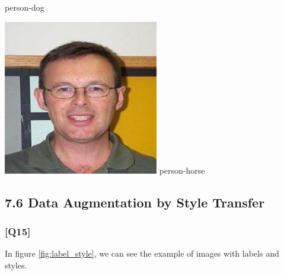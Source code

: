 \documentclass{article}
\begin{document}
\begin{center}
\begin{minipage}{0.142\textwidth}
        person-dog
    \end{minipage}%
    \begin{minipage}{0.142\textwidth}
        \includegraphics[width=\linewidth]{./pic/misclassified_r6_p4_2723.jpg}
        person-horse
    \end{minipage}%

    \label{fig:misclassified}
\end{center}

\subsection*{7.6 Data Augmentation by Style Transfer}

\subsubsection*{[Q15]}

In figure \ref{fig:label_style}, we can see the example of images with labels and styles.
\end{document}
